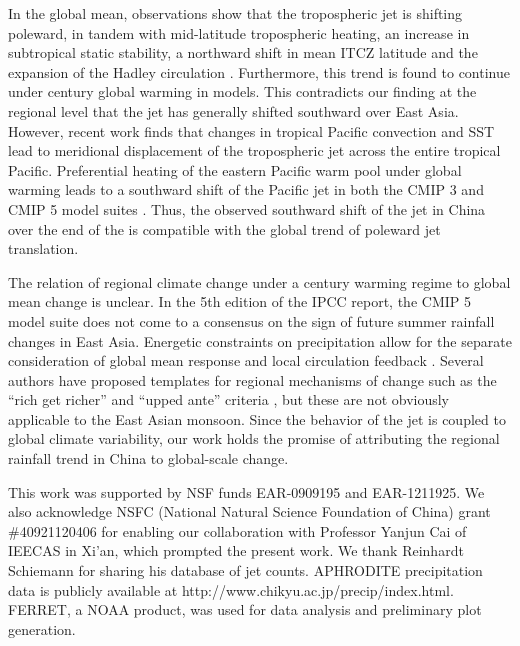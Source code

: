 \documentclass[draft,grl]{AGUTeX}
\begin{document}
\begin{article}
In the global mean, observations show that the tropospheric jet is shifting poleward, in tandem with mid-latitude tropospheric heating, an increase in subtropical static stability, a northward shift in mean ITCZ latitude and the expansion of the Hadley circulation \citep{Fu2006,Archer2008}. Furthermore, this trend is found to continue under  century global warming in models\citep{Lu2007,Kang2012}. This contradicts our finding at the regional level that the jet has generally shifted southward over East Asia. However, recent work finds that changes in tropical Pacific convection and SST lead to meridional displacement of the tropospheric jet across the entire tropical Pacific\citep{Park2014a}. Preferential heating of the eastern Pacific warm pool under global warming leads to a southward shift of the Pacific jet in both the CMIP 3 and CMIP 5 model suites \citep{Park2014}. Thus, the observed southward shift of the jet in China over the end of the  is compatible with the global trend of poleward jet translation.

The relation of regional climate change under a  century warming regime to global mean change is unclear. In the 5th edition of the IPCC report, the CMIP 5 model suite does not come to a consensus on the sign of future summer rainfall changes in East Asia\citep{Christensen2011}. Energetic constraints on precipitation allow for the separate consideration of global mean response and local circulation feedback \citep{Muller2011}. Several authors have proposed templates for regional mechanisms of change such as the ``rich get richer'' and ``upped ante'' criteria \citep{Held2006,Lintner2007,Chou2009}, but these are not obviously applicable to the East Asian monsoon. Since the behavior of the jet is coupled to global climate variability, our work holds the promise of attributing the regional rainfall trend in China to global-scale change.



\begin{acknowledgments}
This work was supported by NSF funds EAR-0909195 and EAR-1211925. We also acknowledge NSFC (National Natural Science Foundation of China) grant \#40921120406 for enabling our collaboration with Professor Yanjun Cai of IEECAS in Xi'an, which prompted the present work. We thank Reinhardt Schiemann for sharing his database of jet counts. APHRODITE precipitation data is publicly available at http://www.chikyu.ac.jp/precip/index.html. FERRET, a NOAA product, was used for data analysis and preliminary plot generation.
\end{acknowledgments}




%
%
\end{article}
%
%
%
%
%
\end{document}
